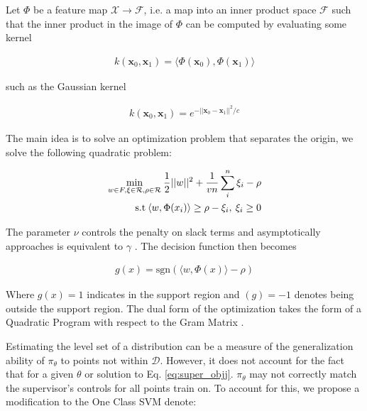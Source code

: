 \documentclass[10pt, conference]{ieeeconf}      %
\newcommand{\bx}{\mathbf{x}}
\newcommand{\mR}{\mathcal{R}}
\begin{document}
Let $\Phi$ be a feature map $\mathcal{X} \rightarrow \mathcal{F}$, i.e. a map into an inner product space $\mathcal{F}$ such that the inner product in the image of $\Phi$ can be computed by evaluating some  kernel

\vspace{-2ex}
\begin{align}
k(\bx_0,\bx_1) = \langle\Phi(\bx_0),\Phi(\bx_1)\rangle
\end{align}

such as the Gaussian kernel 

\vspace{-2ex}
\begin{align}
k(\bx_0,\bx_1) = e^{-||\bx_0 - \bx_1||^2/c}
\end{align}

The main idea is to solve an optimization problem that separates the origin, we solve the following quadratic problem:

\vspace{-2ex}
\begin{align}\label{eq:primal_sup}
\underset{w\in F, \mathbf{\xi} \in \mR, \rho \in \mR}{\mbox{min}}\: \frac{1}{2}||w||^2+\frac{1}{vn} \sum^n_i \xi_i - \rho\\
\mbox{s.t} \: \langle w,\Phi(x_i) \rangle \geq \rho - \xi_i, \: \xi_i \geq 0 \notag
\end{align}

The parameter $\nu$ controls the penalty on slack terms and asymptotically approaches is equivalent to $\gamma$ \cite{vert2006consistency}.  The decision function then becomes 

\vspace{-2ex}
\begin{align}\label{eq:decision_func}
g(x) = \mbox{sgn}(\langle w,\Phi(x) \rangle-\rho)
\end{align}

Where $g(x) = 1$ indicates in the support region and $(g) = -1$ denotes being outside the support region. The dual form of the optimization takes the form of a Quadratic Program with respect to the Gram Matrix \cite{scholkopf2001estimating}. 

Estimating the level set of a distribution can be a measure of the generalization ability of $\pi_{\theta}$ to points not within $\mathcal{D}$. However, it does not account for the fact that for a given $\theta$ or  solution to Eq. \ref{eq:super_objj}. $\pi_\theta$ may not correctly match the supervisor's controls for all points train on. To account for this, we propose a modification to the One Class SVM denote: 
\end{document}
